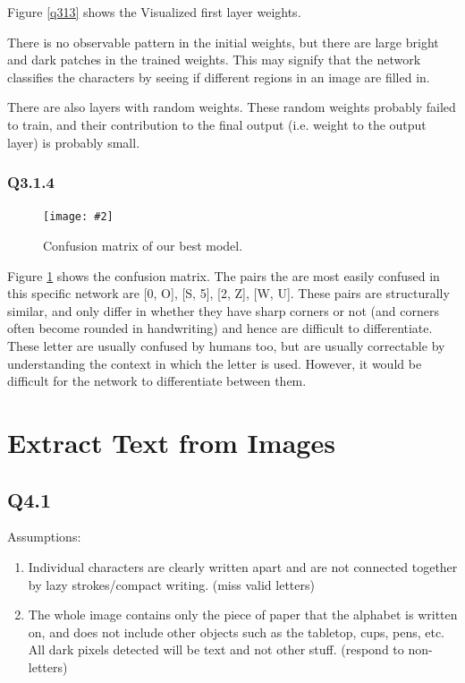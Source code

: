 \documentclass{article} %
\newcommand{\imgl}[4][0.3]{    
    \begin{figure}[H]
        \centering
        \texttt{[image: \#2]}
        \caption{#3}
        \label{#4}
    \end{figure}
}
\begin{document}
    Figure \ref{q313} shows the Visualized first layer weights.
    \medskip

    There is no observable pattern in the initial weights, but there are large bright and dark patches in the trained weights. This may signify that the network classifies the characters by seeing if different regions in an image are filled in.
    \medskip

    There are also layers with random weights. These random weights probably failed to train, and their contribution to the final output (i.e. weight to the output layer) is probably small.

    \subsubsection*{Q3.1.4}

    \imgl{3,1,2 x0.1 confusion.png}{Confusion matrix of our best model.}{q314}

    Figure \ref{q314} shows the confusion matrix. The pairs the are most easily confused in this specific network are [0, O], [S, 5], [2, Z], [W, U]. These pairs are structurally similar, and only differ in whether they have sharp corners or not (and corners often become rounded in handwriting) and hence are difficult to differentiate. These letter are usually confused by humans too, but are usually correctable by understanding the context in which the letter is used. However, it would be difficult for the network to differentiate between them.

    \section{Extract Text from Images}
        
    \subsection*{Q4.1}

    Assumptions:
    \begin{enumerate}
        \item Individual characters are clearly written apart and are not connected together by lazy strokes/compact writing. (miss valid letters)
        \item The whole image contains only the piece of paper that the alphabet is written on, and does not include other objects such as the tabletop, cups, pens, etc. All dark pixels detected will be text and not other stuff. (respond to non-letters)
    \end{enumerate}
\end{document}
